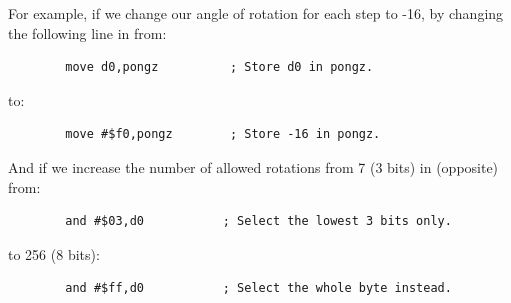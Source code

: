  For example, if we change our angle of rotation for each step to -16, by changing the following
 line in  from:
\begin{lstlisting}
        move d0,pongz          ; Store d0 in pongz.
\end{lstlisting}
to:
\begin{lstlisting}
        move #$f0,pongz        ; Store -16 in pongz.
\end{lstlisting}
And if we increase the number of allowed rotations from 7 (3 bits) in  (opposite) from:
\begin{lstlisting}
        and #$03,d0           ; Select the lowest 3 bits only.
\end{lstlisting}
to 256 (8 bits):
\begin{lstlisting}
        and #$ff,d0           ; Select the whole byte instead.
\end{lstlisting}

